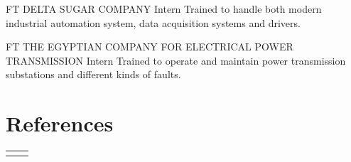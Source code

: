 \documentclass[10pt]{article} %
\begin{document}
\begin{paracol}{2}
{FT} %
{DELTA SUGAR COMPANY} %
{Intern} %
{Trained to handle both modern industrial automation system, data acquisition systems and drivers.}

{FT} %
{THE EGYPTIAN COMPANY FOR ELECTRICAL POWER TRANSMISSION} %
{Intern} %
{Trained to operate and maintain power transmission substations and different kinds of faults.}


\vspace{-\baselineskip}\medskip %


\section{References}







\begin{supertabular}{rl} %
	
	
	

\end{supertabular}
\end{paracol}
\end{document}
